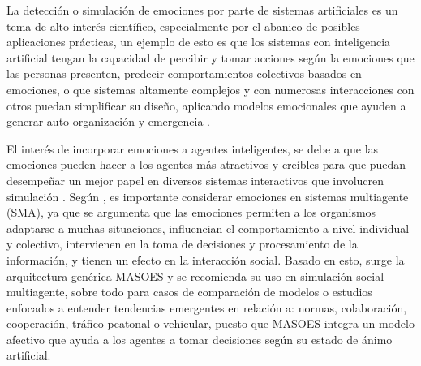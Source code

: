 %
%
%



La detección o simulación de emociones por parte de sistemas artificiales es un
tema de alto interés científico, especialmente por el abanico de posibles
aplicaciones prácticas, un ejemplo de esto es que los sistemas con inteligencia
artificial tengan la capacidad de percibir y tomar acciones según la emociones
que las personas presenten, predecir comportamientos colectivos basados en
emociones, o que sistemas altamente complejos y con numerosas interacciones con
otros puedan simplificar su diseño, aplicando modelos emocionales que ayuden a
generar auto-organización y emergencia \citep{perozo2011}.

El interés de incorporar emociones a agentes inteligentes, se debe a que las
emociones pueden hacer a los agentes más atractivos y creíbles para que puedan
desempeñar un mejor papel en diversos sistemas interactivos que involucren
simulación \citep{jiang2007}. Según \cite{perozo2012}, es importante considerar
emociones en sistemas multiagente (SMA), ya que se argumenta que las emociones
permiten a los organismos adaptarse a muchas situaciones, influencian el
comportamiento a nivel individual y colectivo, intervienen en la toma de
decisiones y procesamiento de la información, y tienen un efecto en la
interacción social. Basado en esto, surge la arquitectura genérica
MASOES y se recomienda su uso en simulación social multiagente, sobre todo para
casos de comparación de modelos o estudios enfocados a entender tendencias
emergentes en relación a: normas, colaboración, cooperación, tráfico peatonal o
vehicular, puesto que MASOES integra un modelo afectivo que ayuda a los
agentes a tomar decisiones según su estado de ánimo artificial.

